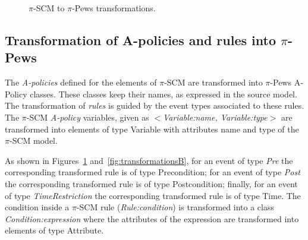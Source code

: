 \begin{figure}[t]
\caption{ $\pi$-SCM to $\pi$-{\sc Pews} transformations.}
\label{fig:transformationsA}
\end{figure}


\subsection{Transformation of A-policies and rules into $\pi$-{\sc Pews}}

The {\em A-policies} defined for the elements of $\pi$-SCM are transformed into $\pi$-{\sc Pews} {\sc A-Policy} classes.
These classes keep their names, as expressed in the source model. 
The transformation of \textit{rules} is guided by the event types associated to these rules.
The $\pi$-SCM {\em A-policy} variables, given as {\sc\em $<$Variable:name, Variable:type$>$} are transformed into elements of type {\sc Variable} with attributes {\sc name} and {\sc type} of the $\pi$-SCM model.

As shown in Figures~\ref{fig:transformationsA} and~\ref{fig:transformationsB}, for an event of type {\sc\em Pre} the corresponding transformed rule is of type {\sc Precondition}; for an event of type {\sc\em Post} the corresponding transformed rule is of type {\sc Postcondition}; finally, for an event of type {\sc\em TimeRestriction} the corresponding transformed rule is of type {\sc Time}. 
The condition inside a $\pi$-SCM rule ({\sc\em Rule:condition}) is transformed into a class {\sc\em Condition:expression} where the attributes of the expression are transformed into elements of type {\sc Attribute}.

